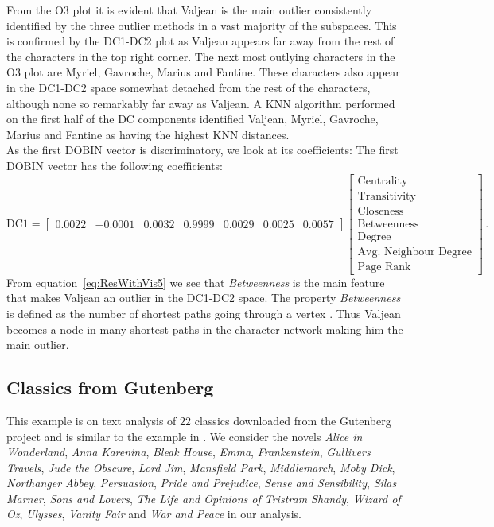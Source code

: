 \documentclass[a4paper,11pt]{article}
\begin{document}
From the O3 plot it is evident that Valjean is the main outlier consistently identified by the three outlier methods in a vast majority of the subspaces.  This is confirmed by the DC1-DC2 plot as Valjean appears far away from the rest of the characters in the top right corner.  The next most outlying characters in the O3 plot are Myriel, Gavroche, Marius and Fantine. These characters also appear in the DC1-DC2 space somewhat detached from the rest of the characters, although none so remarkably far away as Valjean. A KNN algorithm performed on the first half of the DC components identified Valjean, Myriel, Gavroche, Marius and Fantine as having the highest KNN distances. \\

As the first DOBIN vector is discriminatory, we look at its coefficients:
The first DOBIN vector has the following coefficients:
\begin{equation}\label{eq:ResWithVis5}
    \text{DC1} = \begin{bmatrix}
    0.0022 & -0.0001 &  0.0032 & 0.9999 & 0.0029 & 0.0025 & 0.0057  
    \end{bmatrix}
    \begin{bmatrix}
    \text{Centrality} \\
    \text{Transitivity} \\
    \text{Closeness} \\
    \text{Betweenness} \\
    \text{Degree} \\
    \text{Avg. Neighbour Degree}\\
    \text{Page Rank}
    \end{bmatrix} \, .
\end{equation}
From equation~\eqref{eq:ResWithVis5} we see that \textit{Betweenness} is the main feature that makes Valjean an outlier in the DC1-DC2 space. The property \textit{Betweenness} is defined as the number of shortest paths going through a vertex \citep{igraph}. Thus Valjean becomes a node in many shortest paths in the character network making him the main outlier.  

\subsection{Classics from Gutenberg}\label{sec:ResWithVis6}
This example is on text analysis of $22$ classics downloaded from the Gutenberg project \citep{gutenberg} and  is similar to the example in \cite{wilkinson2017visualizing}. We consider the novels \textit{Alice in Wonderland}, \textit{Anna Karenina}, \textit{Bleak House}, \textit{Emma}, \textit{Frankenstein}, \textit{Gullivers Travels}, \textit{Jude the Obscure}, \textit{Lord Jim}, \textit{Mansfield Park}, \textit{Middlemarch}, \textit{Moby Dick}, \textit{Northanger Abbey}, \textit{Persuasion}, \textit{Pride and Prejudice}, \textit{Sense and Sensibility}, \textit{Silas Marner}, \textit{Sons and Lovers}, \textit{The Life and Opinions of Tristram Shandy}, \textit{Wizard of Oz}, \textit{Ulysses}, \textit{Vanity Fair} and  \textit{War and Peace} in our analysis. \\
\end{document}
